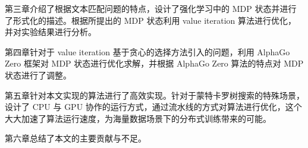 第三章介绍了根据文本匹配问题的特点，设计了强化学习中的 MDP 状态并进行了形式化的描述。根据所提出的 MDP 状态利用 value iteration 算法进行优化，并对实验结果进行分析。

第四章针对于 value iteration 基于贪心的选择方法引入的问题，利用 AlphaGo Zero 框架对 MDP 状态进行优化求解，并根据 AlphaGo Zero 算法的特点对 MDP 状态进行了调整。

第五章针对本文实现的算法进行了高效实现。针对于蒙特卡罗树搜索的特殊场景，设计了 CPU 与 GPU 协作的运行方式，通过流水线的方式对算法进行优化，这个大大加速了算法运行速度，为海量数据场景下的分布式训练带来的可能。

第六章总结了本文的主要贡献与不足。

